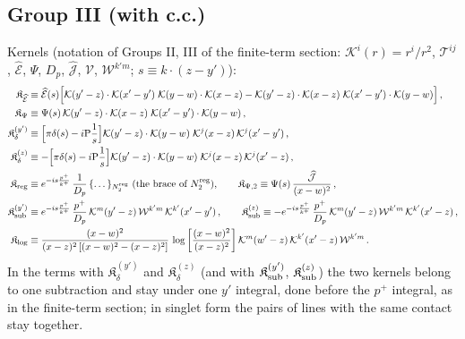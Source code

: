 \subsection{Group III (with c.c.)}
\noindent Kernels (notation of Groups II, III of the finite-term section: $\mathcal{K}^{i}(r)=r^{i}/r^{2}$, $\mathcal{T}^{ij}$, $\widehat{\mathcal{E}}$, $\Psi$, $D_{p}$, $\widehat{\mathcal{J}}$, $\mathcal{V}$, $\mathcal{W}^{k'm}$; $s\equiv k\cdot(z-y')$):
\begin{align}
\mathfrak{K}_{\widehat{\mathcal{E}}}&\equiv\widehat{\mathcal{E}}(s)\Big[\mathcal{K}(y'-z)\cdot\mathcal{K}(x'-y')\;\mathcal{K}(y-w)\cdot\mathcal{K}(x-z)-\mathcal{K}(y'-z)\cdot\mathcal{K}(x-z)\;\mathcal{K}(x'-y')\cdot\mathcal{K}(y-w)\Big]\,,\notag\\
\mathfrak{K}_{\Psi}&\equiv\Psi(s)\,\mathcal{K}(y'-z)\cdot\mathcal{K}(x-z)\;\mathcal{K}(x'-y')\cdot\mathcal{K}(y-w)\,,\notag\\
\mathfrak{K}_{\delta}^{(y')}&\equiv\Big[\pi\delta(s)-i{\rm P}\frac{1}{s}\Big]\mathcal{K}(y'-z)\cdot\mathcal{K}(y-w)\;\mathcal{K}^{j}(x-z)\,\mathcal{K}^{j}(x'-y')\,,\notag\\
\mathfrak{K}_{\delta}^{(z)}&\equiv-\Big[\pi\delta(s)-i{\rm P}\frac{1}{s}\Big]\mathcal{K}(y'-z)\cdot\mathcal{K}(y-w)\;\mathcal{K}^{j}(x-z)\,\mathcal{K}^{j}(x'-z)\,,\notag\\
\mathfrak{K}_{\rm reg}&\equiv e^{-is\frac{p^{+}}{k^{+}}}\,\frac{1}{D_{p}}\,\{\dots\}_{N_{2}^{\rm reg}}\ \text{(the brace of $N_{2}^{\rm reg}$)},\qquad
\mathfrak{K}_{\Psi,2}\equiv\Psi(s)\,\frac{\widehat{\mathcal{J}}}{(x-w)^{2}}\,,\notag\\
\mathfrak{K}_{\rm sub}^{(y')}&\equiv e^{-is\frac{p^{+}}{k^{+}}}\,\frac{p^{+}}{D_{p}}\,\mathcal{K}^{m}(y'-z)\,\mathcal{W}^{k'm}\,\mathcal{K}^{k'}(x'-y')\,,\qquad
\mathfrak{K}_{\rm sub}^{(z)}\equiv-e^{-is\frac{p^{+}}{k^{+}}}\,\frac{p^{+}}{D_{p}}\,\mathcal{K}^{m}(y'-z)\,\mathcal{W}^{k'm}\,\mathcal{K}^{k'}(x'-z)\,,\notag\\
\mathfrak{K}_{\log}&\equiv\frac{(x-w)^{2}}{(x-z)^{2}\left[(x-w)^{2}-(x-z)^{2}\right]}\,\log\left[\frac{(x-w)^{2}}{(x-z)^{2}}\right]\mathcal{K}^{m}(w'-z)\,\mathcal{K}^{k'}(x'-z)\,\mathcal{W}^{k'm}\,.\notag
\end{align}
In the terms with $\mathfrak{K}_{\delta}^{(y')}$ and $\mathfrak{K}_{\delta}^{(z)}$ (and with $\mathfrak{K}_{\rm sub}^{(y')}$, $\mathfrak{K}_{\rm sub}^{(z)}$) the two kernels belong to one subtraction and stay under one $y'$ integral, done before the $p^{+}$ integral, as in the finite-term section; in singlet form the pairs of lines with the same contact stay together.
